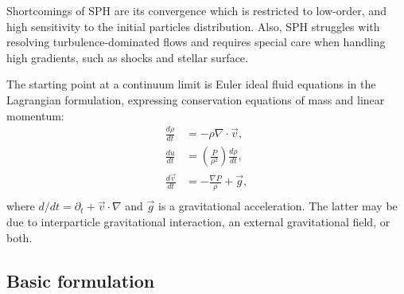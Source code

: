 \documentclass{article}
\begin{document}
Shortcomings of SPH are its convergence which is restricted to low-order, 
and high sensitivity to the initial particles distribution. 
Also, SPH struggles with resolving turbulence-dominated flows and requires
special care when handling high gradients, such as shocks and stellar surface.

The starting point at a continuum limit is Euler ideal fluid equations in the
Lagrangian formulation, expressing conservation equations of mass and linear
momentum:
\begin{align}
\frac{d \rho}{d t} &= - \rho \nabla \cdot \vec{v}, \\
\frac{d u}{d t} &= \left( \frac{P}{\rho^2} \right) \frac{d \rho}{d t}, \\
\frac{d \vec{v}}{d t} &= - \frac{\nabla P}{\rho} + \vec{g}, \\
\end{align}
where $d/dt = \partial_t + \vec{v} \cdot \nabla$ and $\vec{g}$ is
a gravitational acceleration. The latter may be due to interparticle
gravitational interaction, an external gravitational field, or both.

\subsection{Basic formulation}
\label{sec:basic_formulation}
\end{document}
